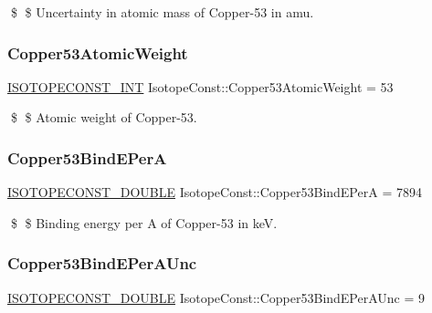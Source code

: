 \$ \$ Uncertainty in atomic mass of Copper-\/53 in amu. \mbox{\label{group___isotope_const-_copper-_cu53_gad7386dcdbc5ffc5fdb13c001ce626f03}} 
\subsubsection{\texorpdfstring{Copper53\+Atomic\+Weight}{Copper53AtomicWeight}}
{\footnotesize\ttfamily \mbox{\hyperlink{group___isotope_const-_macros_ga5f18360b3e99483a35c32d789e62621c}{I\+S\+O\+T\+O\+P\+E\+C\+O\+N\+S\+T\+\_\+\+I\+NT}} Isotope\+Const\+::\+Copper53\+Atomic\+Weight = 53}

\$ \$ Atomic weight of Copper-\/53. \mbox{\label{group___isotope_const-_copper-_cu53_ga136c69b879808d7da36a08fa79b6fc70}} 
\subsubsection{\texorpdfstring{Copper53\+Bind\+E\+PerA}{Copper53BindEPerA}}
{\footnotesize\ttfamily \mbox{\hyperlink{group___isotope_const-_macros_ga8f45a7272ce02c0b4c65c44636ed719a}{I\+S\+O\+T\+O\+P\+E\+C\+O\+N\+S\+T\+\_\+\+D\+O\+U\+B\+LE}} Isotope\+Const\+::\+Copper53\+Bind\+E\+PerA = 7894}

\$ \$ Binding energy per A of Copper-\/53 in keV. \mbox{\label{group___isotope_const-_copper-_cu53_ga11c4fa376f9a1992373661884e07637b}} 
\subsubsection{\texorpdfstring{Copper53\+Bind\+E\+Per\+A\+Unc}{Copper53BindEPerAUnc}}
{\footnotesize\ttfamily \mbox{\hyperlink{group___isotope_const-_macros_ga8f45a7272ce02c0b4c65c44636ed719a}{I\+S\+O\+T\+O\+P\+E\+C\+O\+N\+S\+T\+\_\+\+D\+O\+U\+B\+LE}} Isotope\+Const\+::\+Copper53\+Bind\+E\+Per\+A\+Unc = 9}

